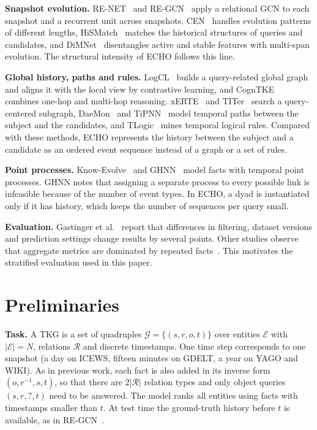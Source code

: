 \documentclass[runningheads]{llncs}
\newcommand{\model}{ECHO}
\newcommand{\para}[1]{\smallskip\noindent\textbf{#1}}
\begin{document}
\para{Snapshot evolution.} RE-NET~\cite{jin2020renet} and RE-GCN~\cite{li2021regcn} apply a relational GCN to each snapshot and a recurrent unit across snapshots. CEN~\cite{li2022cen} handles evolution patterns of different lengths, HiSMatch~\cite{li2022hismatch} matches the historical structures of queries and candidates, and DiMNet~\cite{dong2025dimnet} disentangles active and stable features with multi-span evolution. The structural intensity of \model{} follows this line.

\para{Global history, paths and rules.} LogCL~\cite{chen2024logcl} builds a query-related global graph and aligns it with the local view by contrastive learning, and CognTKE~\cite{chen2025cogntke} combines one-hop and multi-hop reasoning. xERTE~\cite{han2021xerte} and TITer~\cite{sun2021titer} search a query-centered subgraph, DaeMon~\cite{dong2023daemon} and TiPNN~\cite{dong2024tipnn} model temporal paths between the subject and the candidates, and TLogic~\cite{liu2022tlogic} mines temporal logical rules. Compared with these methods, \model{} represents the history between the subject and a candidate as an ordered event sequence instead of a graph or a set of rules.

\para{Point processes.} Know-Evolve~\cite{trivedi2017knowevolve} and GHNN~\cite{han2020ghnn} model facts with temporal point processes. GHNN notes that assigning a separate process to every possible link is infeasible because of the number of event types. In \model{}, a dyad is instantiated only if it has history, which keeps the number of sequences per query small.

\para{Evaluation.} Gastinger et al.~\cite{gastinger2023apples} report that differences in filtering, dataset versions and prediction settings change results by several points. Other studies observe that aggregate metrics are dominated by repeated facts~\cite{gastinger2024history,zhang2026evolution,strikingness2026}. This motivates the stratified evaluation used in this paper.

\section{Preliminaries}
\label{sec:prelim}

\para{Task.} A TKG is a set of quadruples $\mathcal{G} = \{(s, r, o, t)\}$ over entities $\mathcal{E}$ with $|\mathcal{E}| = N$, relations $\mathcal{R}$ and discrete timestamps. One time step corresponds to one snapshot (a day on ICEWS, fifteen minutes on GDELT, a year on YAGO and WIKI). As in previous work, each fact is also added in its inverse form $(o, r^{-1}, s, t)$, so that there are $2|\mathcal{R}|$ relation types and only object queries $(s, r, ?, t)$ need to be answered. The model ranks all entities using facts with timestamps smaller than $t$. At test time the ground-truth history before $t$ is available, as in RE-GCN~\cite{li2021regcn}.
\end{document}
